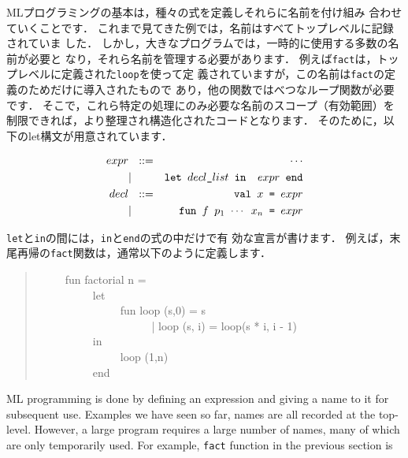 \documentclass{jbook}
\newcommand{\myem}{\ \ \ \ \  }
\newcommand{\myfm}{ \ \ \ \ \ }
\begin{document}
\ifx\jp%
	MLプログラミングの基本は，種々の式を定義しそれらに名前を付け組み
合わせていくことです．
	これまで見てきた例では，名前はすべてトップレベルに記録されていま
した．
	しかし，大きなプログラムでは，一時的に使用する多数の名前が必要と
なり，それら名前を管理する必要があります．
	例えば{\tt fact}は，トップレベルに定義された{\tt loop}を使って定
義されていますが，この名前は{\tt fact}の定義のためだけに導入されたもので
あり，他の関数ではべつなループ関数が必要です．
	そこで，これら特定の処理にのみ必要な名前のスコープ（有効範囲）を
制限できれば，より整理され構造化されたコードとなります．
	そのために，以下のlet構文が用意されています．
\begin{tt}
\begin{eqnarray*}
expr &\mbox{\ \ }::=& \cdots \\
     &|& \mbox{\tt let\ $decl\_list$\ in \ $expr$\ end}
\\
decl &\mbox{\ \ }::=& \mbox{\tt val\ $x$ = $expr$}
\\
     &|& \mbox{\tt fun\ $f$\ $p_1$ $\cdots$ $x_n$ =  $expr$}
\end{eqnarray*}
\end{tt}
	{\tt let}と{\tt in}の間には，{\tt in}と{\tt end}の式の中だけで有
効な宣言が書けます．
	例えば，末尾再帰の{\tt fact}関数は，通常以下のように定義します．
\begin{tt}
\begin{quote}
\myem  fun factorial n =
\\\myem\myem    let
\\\myem\myem\myem      fun loop (s,0) = s
\\\myem\myem\myem\myfm        | loop (s, i) = loop(s * i, i - 1)
\\\myem\myem    in
\\\myem\myem\myem      loop (1,n)
\\\myem\myem    end
\end{quote}
\end{tt}
\else%
	ML programming is done by defining an expression and giving a
name to it for subsequent use.
	Examples we have seen so far, names are all recorded at the
top-level.
	However, a large program requires a large number of names, many
of which are only temporarily used.
	For example, {\tt fact} function in the previous section is
\end{document}
